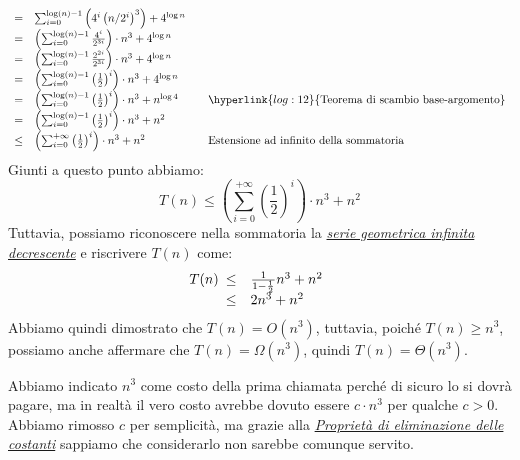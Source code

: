 \begin{eg}
\[\begin{array}[t]{cll}
        = & \sum_{i=0}^{\log(n)-1}\left(4^i\left(n/2^i\right)^3\right)+4^{\log n}\\
        = & \left(\sum_{i=0}^{\log(n)-1}\frac{4^i}{2^{3i}}\right)\cdot n^3 + 4^{\log n}\\
        = & \left(\sum_{i=0}^{\log(n)-1}\frac{2^{2i}}{2^{3i}}\right)\cdot n^3 + 4^{\log n}\\
        = & \left(\sum_{i=0}^{\log(n)-1}\left(\frac{1}{2}\right)^i\right)\cdot n^3 + 4^{\log n}\\
        = & \left(\sum_{i=0}^{\log(n)-1}\left(\frac{1}{2}\right)^i\right)\cdot n^3 + n^{\log 4} &
        \quad\hyperlink{log:12}{\text{Teorema di scambio base-argomento}}\\
        = & \left(\sum_{i=0}^{\log(n)-1}\left(\frac{1}{2}\right)^i\right)\cdot n^3 + n^2\\
        \leq & \left(\sum_{i=0}^{+\infty}\left(\frac{1}{2}\right)^i\right)\cdot n^3 + n^2 &
        \quad\text{Estensione ad infinito della sommatoria}\\
    \end{array}\]
    Giunti a questo punto abbiamo:
    \[T(n)\leq\left(\sum_{i=0}^{+\infty}\left(\frac{1}{2}\right)^i\right)\cdot n^3 + n^2\]
    Tuttavia, possiamo riconoscere nella sommatoria la \hyperlink{ser:4}
    {\emph{serie geometrica infinita decrescente}} e riscrivere $T(n)$ come:
    \[T(n)\begin{array}[t]{cl}
        \leq & \frac{1}{1-\frac{1}{2}}n^3+n^2\\
        \leq & 2n^3+n^2
    \end{array}\]
    Abbiamo quindi dimostrato che $T(n)=O(n^3)$, tuttavia, poiché $T(n)\geq n^3$,
    possiamo anche affermare che $T(n)=\Omega(n^3)$, quindi $T(n)=\Theta(n^3)$.
\end{eg}

\begin{note}
    Abbiamo indicato $n^3$ come costo della prima chiamata perché di sicuro
    lo si dovrà pagare, ma in realtà il vero costo avrebbe dovuto essere
    $c\cdot n^3$ per qualche $c>0$. Abbiamo rimosso $c$ per semplicità, ma
    grazie alla \hyperlink{prop:elimcost}{\emph{Proprietà di eliminazione
    delle costanti}} sappiamo che considerarlo non sarebbe comunque servito.
\end{note}

